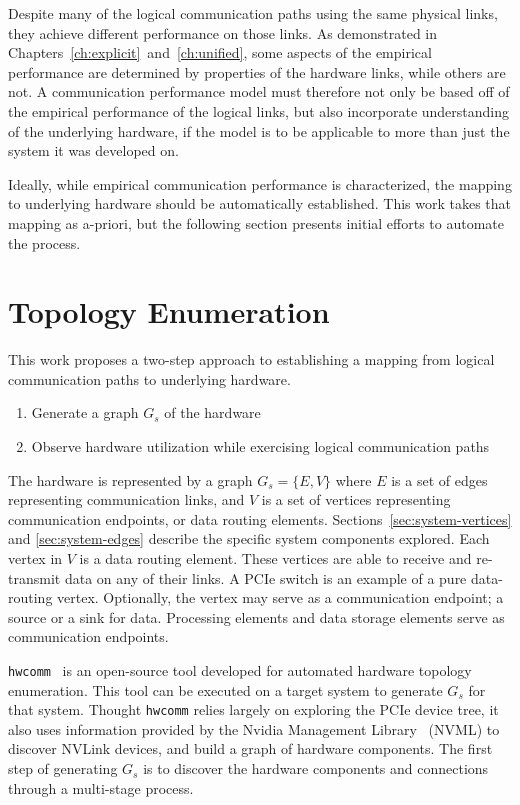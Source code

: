 Despite many of the logical communication paths using the same physical links, they achieve different performance on those links.
As demonstrated in Chapters~\ref{ch:explicit}~and~\ref{ch:unified}, some aspects of the empirical performance are determined by properties of the hardware links, while others are not.
A communication performance model must therefore not only be based off of the empirical performance of the logical links, but also incorporate understanding of the underlying hardware, if the model is to be applicable to more than just the system it was developed on.

Ideally, while empirical communication performance is characterized, the mapping to underlying hardware should be automatically established.
This work takes that mapping as a-priori, but the following section presents initial efforts to automate the process.

\section{Topology Enumeration}
\label{sec:hardware-enumeration}

This work proposes a two-step approach to establishing a mapping from logical communication paths to underlying hardware.
\begin{enumerate}
    \item Generate a graph $G_s$ of the hardware
    \item Observe hardware utilization while exercising logical communication paths
\end{enumerate}
The hardware is represented by a graph $G_s = \{E,V\}$ where $E$ is a set of edges representing communication links, and $V$ is a set of vertices representing communication endpoints, or data routing elements.
Sections~\ref{sec:system-vertices} and \ref{sec:system-edges} describe the specific system components explored.
Each vertex in $V$ is a data routing element.
These vertices are able to receive and re-transmit data on any of their links.
A PCIe switch is an example of a pure data-routing vertex.
Optionally, the vertex may serve as a communication endpoint; a source or a sink for data.
Processing elements and data storage elements serve as communication endpoints.

\texttt{hwcomm}~\cite{pearson2018hwcomm} is an open-source tool developed for automated hardware topology enumeration.
This tool can be executed on a target system to generate $G_s$ for that system.
Thought \texttt{hwcomm} relies largely on exploring the PCIe device tree, it also uses information provided by the Nvidia Management Library~\cite{nvidia2017nvml} (NVML) to discover NVLink devices, and build a graph of hardware components.
The first step of generating $G_s$ is to discover the hardware components and connections through a multi-stage process.

